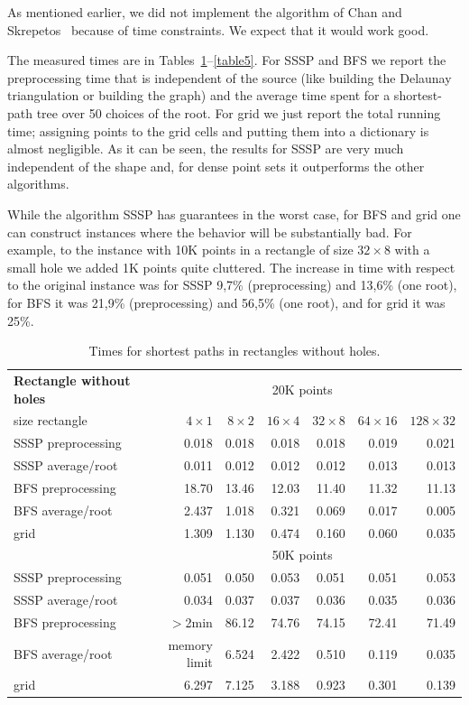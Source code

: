 \documentclass[a4paper,11pt]{article}
\begin{document}
As mentioned earlier, we did not implement the algorithm of Chan and Skrepetos~\cite{ChanS16}
because of time constraints. We expect that it would work good.

The measured times are in Tables~\ref{table1}--\ref{table5}.
For SSSP and BFS we report the preprocessing time that is independent of the source
(like building the Delaunay triangulation or building the graph) and the average
time spent for a shortest-path tree over 50 choices of the root.
For grid we just report the total running time; assigning points to
the grid cells and putting them into a dictionary is almost negligible.
As it can be seen, the results for SSSP are very much independent of the shape and,
for dense point sets it outperforms the other algorithms.

While the algorithm SSSP has guarantees in the worst case,
for BFS and grid one can construct instances 
where the behavior will be substantially bad. 
For example, to the instance with 10K points in a rectangle of size $32\times 8$ 
with a small hole we added 1K points quite cluttered. 
The increase in time with respect to the original instance 
was for SSSP 9,7\% (preprocessing) and 13,6\% (one root), for BFS it was
21,9\% (preprocessing) and 56,5\% (one root), and for grid it was 25\%.


\begin{table}[ht]
\begin{tabular}{l*{6}{r}}
\textbf{Rectangle without holes} & \multicolumn{6}{c}{20K points}\\						
size rectangle	&	$4\times 1$	&	$8\times 2$	&	$16\times 4$	&	$32\times 8$	&	$64\times 16$	&	$128\times 32$	\\
\hline
SSSP preprocessing	&	0.018	&	0.018	&	0.018	&	0.018	&	0.019	&	0.021	\\
SSSP average/root	&	0.011	&	0.012	&	0.012	&	0.012	&	0.013	&	0.013	\\
BFS preprocessing	&	18.70	&	13.46	&	12.03	&	11.40	&	11.32	&	11.13	\\
BFS average/root	&	2.437	&	1.018	&	0.321	&	0.069	&	0.017	&	0.005	\\
grid				&	1.309	&	1.130	&	0.474	&	0.160	&	0.060	&	0.035\vspace{.2cm}	\\
\hline
  & \multicolumn{6}{c}{50K points}\\						
\hline
SSSP preprocessing	&	0.051	&	0.050	&	0.053	&	0.051	&	0.051	&	0.053	\\
SSSP average/root	&	0.034	&	0.037	&	0.037	&	0.036	&	0.035	&	0.036	\\
BFS preprocessing	&	$>$2min	&	86.12	&	74.76	&	74.15	&	72.41	&	71.49	\\
BFS average/root	& \hspace{-.7cm}memory limit & 6.524	&	2.422	&	0.510	&	0.119	&	0.035	\\
grid				&	6.297	&	7.125	&	3.188	&	0.923	&	0.301	&	0.139
\end{tabular}
\caption{Times for shortest paths in rectangles without holes.}
\label{table1}
\end{table}
\end{document}
